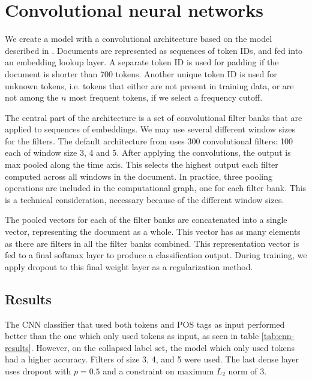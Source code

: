\section{Convolutional neural networks}

We create a model with a convolutional architecture based on the model
described in \textcite{kim2014convolutional}. Documents are represented as
sequences of token IDs, and fed into an embedding lookup layer. A separate
token ID is used for padding if the document is shorter than 700 tokens.
Another unique token ID is used for unknown tokens, i.e. tokens that either
are not present in training data, or are not among the $n$ most frequent
tokens, if we select a frequency cutoff.

The central part of the architecture is a set of convolutional filter banks
that are applied to sequences of embeddings. We may use several different
window sizes for the filters. The default architecture from
\textcite{kim2014convolutional} uses 300 convolutional filters: 100 each of
window size 3, 4 and 5. After applying the convolutions, the output is max
pooled along the time axis. This selects the highest output each filter
computed across all windows in the document. In practice, three pooling
operations are included in the computational graph, one for each filter bank.
This is a technical consideration, necessary because of the different window
sizes.

The pooled vectors for each of the filter banks are concatenated into a
single vector, representing the document as a whole. This vector has as many
elements as there are filters in all the filter banks combined. This
representation vector is fed to a final softmax layer to produce a
classification output. During training, we apply dropout to this final weight
layer as a regularization method.


\subsection{Results}

The \ac{CNN} classifier that used both tokens and POS tags as input performed
better than the one which only used tokens as input, as seen in table
\ref{tab:cnn-results}. However, on the collapsed label set, the model which
only used tokens had a higher accuracy. Filters of size 3, 4, and 5 were
used. The last dense layer uses dropout with $p=0.5$ and a constraint on
maximum $L_2$ norm of 3.

